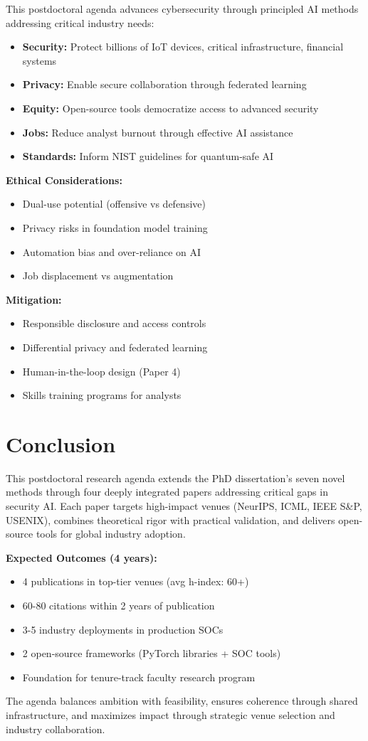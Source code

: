 \documentclass[11pt,letterpaper]{article}
\begin{document}
This postdoctoral agenda advances cybersecurity through principled AI methods addressing critical industry needs:

\begin{itemize}
\item \textbf{Security:} Protect billions of IoT devices, critical infrastructure, financial systems
\item \textbf{Privacy:} Enable secure collaboration through federated learning
\item \textbf{Equity:} Open-source tools democratize access to advanced security
\item \textbf{Jobs:} Reduce analyst burnout through effective AI assistance
\item \textbf{Standards:} Inform NIST guidelines for quantum-safe AI
\end{itemize}

\textbf{Ethical Considerations:}
\begin{itemize}
\item Dual-use potential (offensive vs defensive)
\item Privacy risks in foundation model training
\item Automation bias and over-reliance on AI
\item Job displacement vs augmentation
\end{itemize}

\textbf{Mitigation:}
\begin{itemize}
\item Responsible disclosure and access controls
\item Differential privacy and federated learning
\item Human-in-the-loop design (Paper 4)
\item Skills training programs for analysts
\end{itemize}

\section{Conclusion}

This postdoctoral research agenda extends the PhD dissertation's seven novel methods through four deeply integrated papers addressing critical gaps in security AI. Each paper targets high-impact venues (NeurIPS, ICML, IEEE S\&P, USENIX), combines theoretical rigor with practical validation, and delivers open-source tools for global industry adoption.

\textbf{Expected Outcomes (4 years):}
\begin{itemize}
\item 4 publications in top-tier venues (avg h-index: 60+)
\item 60-80 citations within 2 years of publication
\item 3-5 industry deployments in production SOCs
\item 2 open-source frameworks (PyTorch libraries + SOC tools)
\item Foundation for tenure-track faculty research program
\end{itemize}

The agenda balances ambition with feasibility, ensures coherence through shared infrastructure, and maximizes impact through strategic venue selection and industry collaboration.
\end{document}

